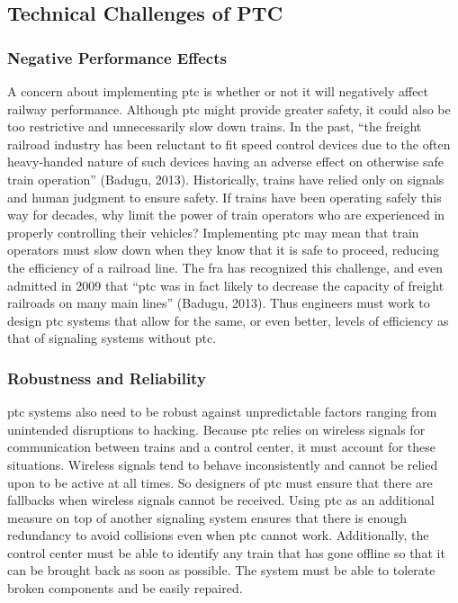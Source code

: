 \documentclass[11pt, titlepage]{article}
\begin{document}
\subsection{Technical Challenges of PTC}

\subsubsection{Negative Performance Effects}

A concern about implementing \gls{ptc} is whether or not it will negatively affect
railway performance. Although \gls{ptc} might provide greater safety, it could also
be too restrictive and unnecessarily slow down trains. In the past, ``the freight
railroad industry has been reluctant to fit speed control devices due to the often
heavy-handed nature of such devices having an adverse effect on otherwise safe
train operation'' (Badugu, 2013). Historically, trains have relied only on signals
and human judgment to ensure safety. If trains have been operating safely this way
for decades, why limit the power of train operators who are experienced in properly
controlling their vehicles? Implementing \gls{ptc} may mean that train operators
must slow down when they know that it is safe to proceed, reducing the efficiency
of a railroad line. The \gls{fra} has recognized this challenge, and even admitted
in 2009 that “\gls{ptc} was in fact likely to decrease the capacity of freight
railroads on many main lines” (Badugu, 2013). Thus engineers must work to design
\gls{ptc} systems that allow for the same, or even better, levels of efficiency as
that of signaling systems without \gls{ptc}.

\subsubsection{Robustness and Reliability}

\gls{ptc} systems also need to be robust against unpredictable factors ranging from
unintended disruptions to hacking. Because \gls{ptc} relies on wireless signals for
communication between trains and a control center, it must account for these
situations. Wireless signals tend to behave inconsistently and cannot be relied
upon to be active at all times. So designers of \gls{ptc} must ensure that there
are fallbacks when wireless signals cannot be received. Using \gls{ptc} as an
additional measure on top of another signaling system ensures that there is enough
redundancy to avoid collisions even when \gls{ptc} cannot work. Additionally, the
control center must be able to identify any train that has gone offline so that it
can be brought back as soon as possible. The system must be able to tolerate broken
components and be easily repaired.
\end{document}
